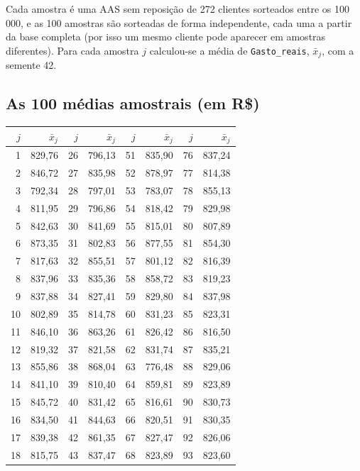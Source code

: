 \documentclass[12pt,a4paper]{article}
\begin{document}
Cada amostra é uma AAS sem reposição de 272 clientes sorteados entre os 100\,000, e as 100 amostras são sorteadas de forma independente, cada uma a partir da base completa (por isso um mesmo cliente pode aparecer em amostras diferentes). Para cada amostra $j$ calculou-se a média de \texttt{Gasto\_reais}, $\bar{x}_j$, com a semente 42.

\subsection*{As 100 médias amostrais (em R\$)}

\begin{center}
\footnotesize
\begin{tabular}{rr|rr|rr|rr}
\toprule
$j$ & $\bar{x}_j$ & $j$ & $\bar{x}_j$ & $j$ & $\bar{x}_j$ & $j$ & $\bar{x}_j$ \\
\midrule
1 & 829,76 & 26 & 796,13 & 51 & 835,90 & 76 & 837,24 \\
2 & 846,72 & 27 & 835,98 & 52 & 878,97 & 77 & 814,38 \\
3 & 792,34 & 28 & 797,01 & 53 & 783,07 & 78 & 855,13 \\
4 & 811,95 & 29 & 796,86 & 54 & 818,42 & 79 & 829,98 \\
5 & 842,63 & 30 & 841,69 & 55 & 815,01 & 80 & 807,89 \\
6 & 873,35 & 31 & 802,83 & 56 & 877,55 & 81 & 854,30 \\
7 & 817,63 & 32 & 855,51 & 57 & 801,12 & 82 & 816,39 \\
8 & 837,96 & 33 & 835,36 & 58 & 858,72 & 83 & 819,23 \\
9 & 837,88 & 34 & 827,41 & 59 & 829,80 & 84 & 837,98 \\
10 & 802,89 & 35 & 814,78 & 60 & 831,23 & 85 & 823,31 \\
11 & 846,10 & 36 & 863,26 & 61 & 826,42 & 86 & 816,50 \\
12 & 819,32 & 37 & 821,58 & 62 & 831,74 & 87 & 835,21 \\
13 & 855,86 & 38 & 868,04 & 63 & 776,48 & 88 & 829,06 \\
14 & 841,10 & 39 & 810,40 & 64 & 859,81 & 89 & 823,89 \\
15 & 845,72 & 40 & 831,42 & 65 & 816,61 & 90 & 830,73 \\
16 & 834,50 & 41 & 844,63 & 66 & 820,51 & 91 & 830,35 \\
17 & 839,38 & 42 & 861,35 & 67 & 827,47 & 92 & 826,06 \\
18 & 815,75 & 43 & 837,47 & 68 & 823,89 & 93 & 823,60 \\

\end{tabular}
\end{center}
\end{document}
